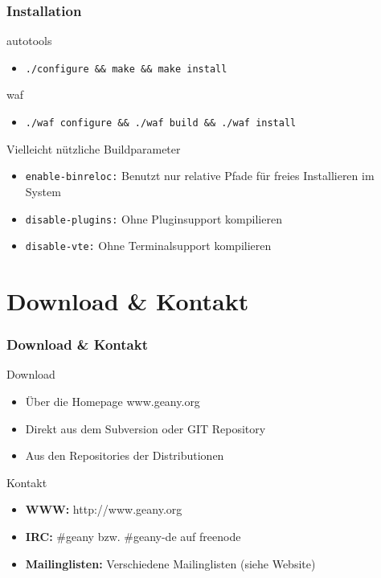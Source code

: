 \documentclass[compress]{beamer}
\begin{document}
\begin{frame}[allowframebreak]
	\frametitle{Installation}
	\begin{block}{autotools}
		\begin{itemize}
			\item \texttt{./configure \&\& make \&\& make install}
		\end{itemize}
	\end{block}
	\pause
	\begin{block}{waf}
		\begin{itemize}
			\item \texttt{./waf configure \&\& ./waf build \&\& ./waf install}
		\end{itemize}
	\end{block}
	\pause
	\begin{block}{Vielleicht nützliche Buildparameter}
		\begin{itemize}
			\item \texttt{enable-binreloc:} Benutzt nur
			 relative Pfade für freies Installieren im System
			\item \texttt{disable-plugins:} Ohne Pluginsupport kompilieren
			\item \texttt{disable-vte:} Ohne Terminalsupport kompilieren
		\end{itemize}
	\end{block}
\end{frame}

\section{Download \& Kontakt}
\begin{frame}
	\frametitle{Download \& Kontakt}
	\begin{block}{Download}
		\begin{itemize}
			\item Über die Homepage www.geany.org
			\item Direkt aus dem Subversion oder GIT Repository
			\item Aus den Repositories der Distributionen
		\end{itemize}
	\end{block}
	\begin{block}{Kontakt}
		\begin{itemize}
			\item \textbf{WWW:} http://www.geany.org
			\item \textbf{IRC:} \#geany bzw. \#geany-de auf freenode
			\item \textbf{Mailinglisten:} Verschiedene Mailinglisten (siehe Website)
		\end{itemize}
	\end{block}
\end{frame}
\end{document}
